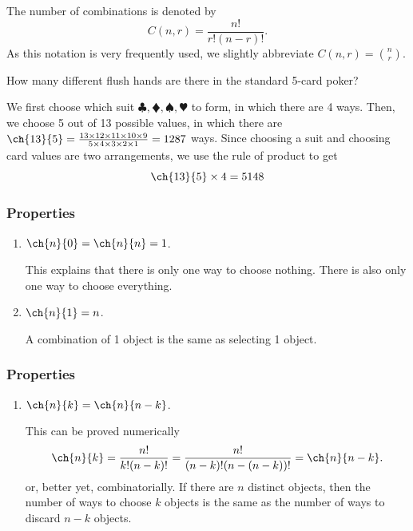 \begin{frame}
\begin{thm}{}{}
The number of combinations is denoted by
\[ C(n,r) = \frac{n!}{r! (n-r)!}.\]
As this notation is very frequently used, we slightly abbreviate $C(n,r) = { n \choose r}$.
\end{thm}
\end{frame}


\begin{frame}[t]
\begin{ex}
How many different flush hands are there in the standard 5-card poker?
\end{ex}
\begin{sol}
We first choose which suit $\clubsuit, \vardiamondsuit, \spadesuit, \varheartsuit$ to form, in which there are 4 ways. Then, we choose 5 out of 13 possible values, in which there are $\ch{13}{5} = \frac{13 \times 12 \times 11 \times 10 \times 9}{5 \times 4 \times 3 \times 2 \times 1} = 1287$ ways. Since choosing a suit and choosing card values are two arrangements, we use the rule of product to get
\[ \ch{13}{5} \times 4 = 5148\]
\end{sol}
\end{frame}

\begin{frame}
\frametitle{Properties}
\begin{prop}{}{}
\begin{enumerate}
\item $\ch{n}{0} = \ch{n}{n} = 1$. \begin{slide}This explains that there is only one way to choose nothing. There is also only one way to choose everything.\end{slide}
\item $\ch{n}{1} = n$. \begin{slide}A combination of 1 object is the same as selecting 1 object.\end{slide}
\end{enumerate}
\end{prop}
\end{frame}



\begin{frame}
\frametitle{Properties}
\begin{prop}{}{}
\begin{enumerate}
\item $\ch{n}{k} = \ch{n}{n-k}$. \begin{slide}This can be proved numerically 
\[ \ch{n}{k} = \frac{n!}{k! (n-k)!} = \frac{n!}{(n-k)! (n- (n-k))!} = \ch{n}{n-k}.\]
or, better yet, combinatorially. If there are $n$ distinct objects, then the number of ways to choose $k$ objects is the same as the number of ways to discard $n-k$ objects.\end{slide}
\end{enumerate}
\end{prop}
\end{frame}

